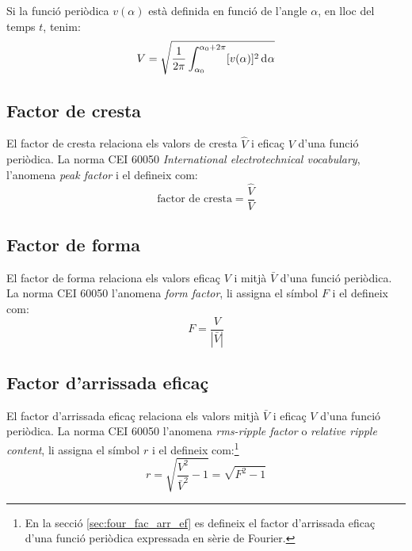 Si la funció periòdica $v(\alpha)$ està definida en funció de
l'angle $\alpha$, en lloc del temps $t$, tenim:
\begin{equation}
    V = \sqrt{\frac{1}{2\pi} \int_{\alpha_0}^{\alpha_0+2\pi}
     [v(\alpha)]^2 \diff \alpha}
\end{equation}

\subsection{Factor de cresta}

El factor de cresta relaciona els valors de cresta $\hat{V}$
  i eficaç $V$ d'una funció periòdica. La norma CEI 60050 \textit{International electrotechnical vocabulary}, l'anomena \textit{peak factor} i el defineix com:
\begin{equation}
     \text{factor de cresta} = \frac{\hat{V}}{V}
\end{equation}

\subsection{Factor de forma}

El factor de forma relaciona els valors eficaç $V$
i mitjà $\bar{V}$ d'una funció periòdica. La norma CEI 60050 l'anomena \textit{form factor}, li assigna el símbol $F$ i el defineix com:
\begin{equation}
    F = \frac{V}{|\bar{V}|}
\end{equation}

\subsection{Factor d'arrissada eficaç}

El factor d'arrissada eficaç relaciona els
valors mitjà $\bar{V}$ i eficaç $V$ d'una funció periòdica.
La norma CEI 60050 l'anomena \textit{rms-ripple factor} o \textit{relative ripple content}, li assigna el símbol $r$ i el defineix com:\footnote{En la secció \ref{sec:four_fac_arr_ef} es defineix el factor d'arrissada eficaç d'una funció periòdica expressada en sèrie de Fourier.}
\begin{equation}
    r = \sqrt{\frac{V^2}{\bar{V}^2}-1} = \sqrt{F^2-1}\label{eq:rms_rip}
\end{equation}

